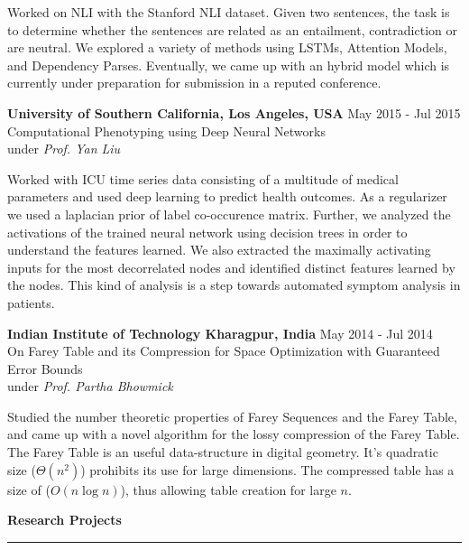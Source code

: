 \documentclass[10pt]{article}
\newcommand{\heading}[1]{
 {\large \textbf{#1}}
  \vspace{0.4em}
  \hrule
  \vspace{0.4em}
}
\newcommand{\EntryGap}{\vspace{0.8em}}
\newcommand{\SmallEntryGap}{\vspace{0.4em}}
\newcommand{\indentedpar}[1]{
  \hangindent=1cm \hangafter=0 #1
}
\begin{document}
\SmallEntryGap

\indentedpar{
  Worked on NLI with the Stanford NLI dataset. Given two sentences, the task
  is to determine whether the sentences are related as an entailment, contradiction
  or are neutral. We explored a variety of methods using LSTMs, Attention
  Models, and Dependency Parses. Eventually, we came up with an hybrid model which
  is currently under preparation for submission in a reputed conference.
}

\SmallEntryGap

\textbf{University of Southern California, Los Angeles, USA} \hfill May 2015 - Jul 2015\\
Computational Phenotyping using Deep Neural Networks\\
under \emph{Prof. Yan Liu}

\SmallEntryGap

\indentedpar{
  Worked with ICU time series data consisting of a multitude of medical parameters
  and used deep learning to predict health outcomes. As a regularizer we used a
  laplacian prior of label co-occurence matrix. Further, we analyzed the
  activations of the trained neural network using decision trees in order to 
  understand the features learned. We also extracted the maximally activating 
  inputs for the most decorrelated nodes and identified distinct features learned
  by the nodes. This kind of analysis is a step towards automated symptom analysis
  in patients.
}

\SmallEntryGap
\textbf{Indian Institute of Technology Kharagpur, India} \hfill May 2014 - Jul 2014\\
On Farey Table and its Compression for Space Optimization with Guaranteed Error Bounds\\
under \emph{Prof. Partha Bhowmick}

\SmallEntryGap

\indentedpar{
  Studied the number theoretic properties of Farey Sequences and the
  Farey Table, and came up with a novel algorithm for the lossy compression of the 
  Farey Table. The Farey Table is an useful data-structure in digital geometry.
  It's quadratic size ($\Theta(n^2)$) prohibits its use for large dimensions. The
  compressed table has a size of ($O(n\log n)$), thus allowing table creation for
  large $n$.
}




\EntryGap
\heading{Research Projects}
\SmallEntryGap
\end{document}
